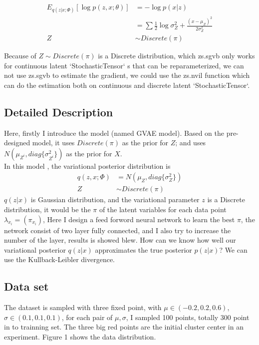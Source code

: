 \documentclass[a4paper]{article}
\begin{document}
\begin{equation}
    \begin{aligned}
        E_{q(z|x;\Phi)}[\log p(z,x;\theta)]  &= - \log p(x|z)\\
        & = \sum \frac{1}{2} \log{\sigma_Z^2} +  \frac{(x-\mu_Z)^2}{2\sigma_Z^2} \\
        Z &\sim Discrete(\pi)
 \end{aligned}
\end{equation} 

Because of $Z \sim Discrete(\pi)$ is a Discrete distribution, which zs.sgvb only works for continuous latent  `StochasticTensor` s that can be reparameterized, we can not use zs.sgvb to 
estimate the gradient, we could use the zs.nvil function which can do the estimation both on continuous and discrete latent  `StochasticTensor`.

\subsection{Detailed Description}
Here, firstly I introduce the model (named GVAE model). Based on the 
pre-designed model,  it uses $Discrete(\pi)$ as the prior for $Z$; and uses 
$N(\mu_{Z^{i}}, diag\{\sigma_{Z^{i}}^{2}\})$ as the prior for $X$.
\\


In this model , the variational posterior distribution is 
\begin{equation}
    \begin{aligned}
        q(z,x;\Phi) &=  N(\mu_{Z}, diag\{\sigma_Z^2\})\\
        Z &\sim Discrete(\pi)
    \end{aligned}
\end{equation} 
 $q(z|x)$ is Gaussian distribution, and the variational parameter $z$ is a Discrete distribution, it would be the $\pi$ of the latent variables for each data point $\lambda_{x_i} = (\pi_{x_i})$, 
Here I design a feed forword neural network to learn the best $\pi$, the network consist of two layer fully connected, and I also try to increase the number of the layer, results is showed blew.
 How can we know how well our variational posterior $q(z|x)$ approximates the true posterior $p(z|x)$? We can use the Kullback-Leibler divergence.



\subsection{Data set}
The dataset is sampled with three fixed point, with $\mu \in (-0.2, 0.2, 0.6)$, $\sigma \in (0.1, 0.1, 0.1)$, for each pair of $\mu , \sigma$, I sampled 100 points, totally 300 point in to trainning set. The three big red points are the initial cluster center in an experiment. Figure 1 shows the data distribution.
\end{document}

